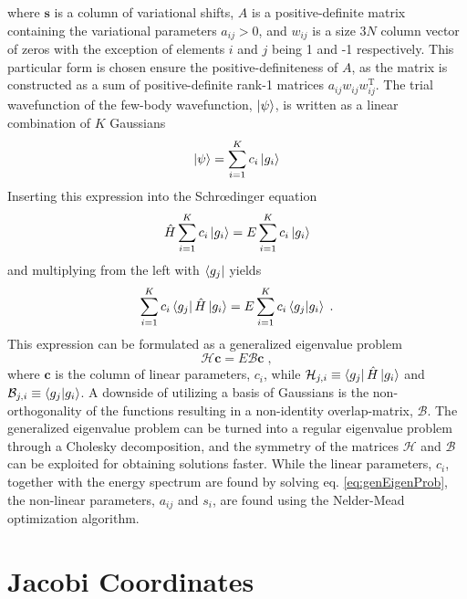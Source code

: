 where $\boldsymbol{s}$ is a column of variational shifts, $A$ is a positive-definite matrix containing the variational parameters $a_{ij} > 0$, and $w_{ij}$ is a size $3 N$ column vector of zeros with the exception of elements $i$ and $j$ being 1 and -1 respectively. 
This particular form is chosen ensure the positive-definiteness of $A$, as the matrix is constructed as a sum of positive-definite rank-1 matrices $a_{ij}  w_{ij} w_{ij}^{\mathrm{T}}$. 
The trial wavefunction of the few-body wavefunction, $\ket{\psi}$, is written as a linear combination of $K$ Gaussians
\begin{equation}
	\ket{\psi} = \sum_{i = 1}^{K} c_i \ket{g_i}
\end{equation}
Inserting this expression into the Schr\oe dinger equation
\begin{equation}
	\hat{H} \sum_{i=1}^{K} c_{i} \ket{g_i} = E \sum_{i=1}^{K} c_{i} \ket{g_i} 
\end{equation}
and multiplying from the left with $\bra{g_j}$ yields
\begin{equation}
	\sum_{i=1}^{K} c_{i} \bra{g_j} \hat{H} \ket{g_i} = E \sum_{i=1}^{K} c_{i} \braket{g_j | g_i} \; .
\end{equation}
This expression can be formulated as a generalized eigenvalue problem
\begin{equation}
	\mathcal{H} \boldsymbol{c} = E \mathcal{B} \boldsymbol{c} \; ,
	\label{eq:genEigenProb}
\end{equation}
where $\boldsymbol{c}$ is the column of linear parameters, $c_i$, while $\mathcal{H}_{j,i} \equiv \bra{g_j} \hat{H} \ket{g_i}$ and $\mathcal{B}_{j,i} \equiv \braket{g_j | g_i}$. A downside of utilizing a basis of Gaussians is the non-orthogonality of the functions resulting in a non-identity overlap-matrix, $\mathcal{B}$. The generalized eigenvalue problem can be turned into a regular eigenvalue problem through a Cholesky decomposition, and the symmetry of the matrices $\mathcal{H}$ and $\mathcal{B}$ can be exploited for obtaining solutions faster. 
While the linear parameters, $c_i$, together with the energy spectrum are found by solving eq. \eqref{eq:genEigenProb}, the non-linear parameters, $a_{ij}$ and $s_i$, are found using the Nelder-Mead optimization algorithm. 



\section{Jacobi Coordinates}

